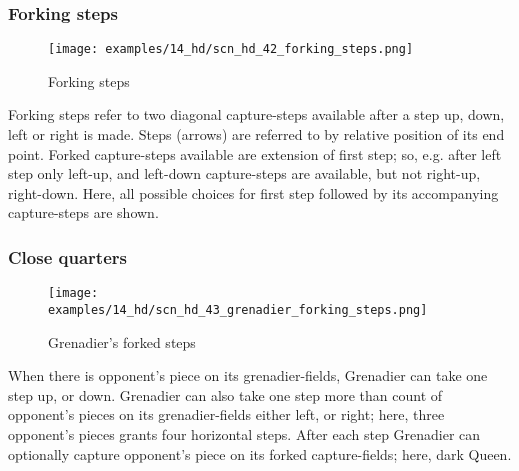 \vspace*{-0.7\baselineskip}
\subsubsection*{Forking steps}
\label{sec:Hemera's Dawn/Grenadier/Movement/Forking steps}

\vspace*{-0.7\baselineskip}
\noindent
\begin{wrapfigure}[11]{l}{0.4\textwidth}
\centering
\texttt{[image: examples/14\_hd/scn\_hd\_42\_forking\_steps.png]}
\vspace*{-0.5\baselineskip}
\caption{Forking steps}
\label{fig:scn_hd_42_forking_steps}
\end{wrapfigure}
Forking steps refer to two diagonal capture-steps available after a step up, down,
left or right is made. \newline
\indent
Steps (arrows) are referred to by relative position of its end point. \newline
\indent
Forked capture-steps available are extension of first step; so, e.g. after left
step only left-up, and left-down capture-steps are available, but not right-up,
right-down. \newline
\indent
Here, all possible choices for first step followed by its accompanying
capture-steps are shown.

\clearpage %

\subsubsection*{Close quarters}
\label{sec:Hemera's Dawn/Grenadier/Movement/Close quarters}

\vspace*{-1.5\baselineskip}
\noindent
\begin{figure}[!h]
\texttt{[image: examples/14\_hd/scn\_hd\_43\_grenadier\_forking\_steps.png]}
\vspace*{-1.4\baselineskip}
\caption{Grenadier's forked steps}
\label{fig:scn_hd_43_grenadier_forking_steps}
\end{figure}

\vspace*{-0.7\baselineskip}
When there is opponent's piece on its grenadier-fields, Grenadier can take one step
up, or down. Grenadier can also take one step more than count of opponent's pieces
on its grenadier-fields either left, or right; here, three opponent's pieces grants
four horizontal steps. After each step Grenadier can optionally capture opponent's
piece on its forked capture-fields; here, dark Queen.

